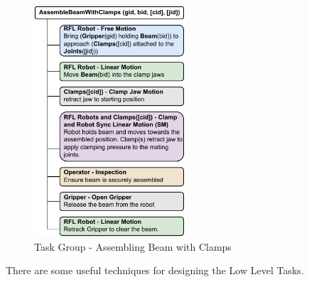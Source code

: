\begin{figure}[!p]
    \centering
    \includegraphics[width=0.50\textwidth]{images/6a/lowleveltask-5.pdf}
    \caption{Task Group - Assembling Beam with Clamps}
    \label{fig:task-group-5}
\end{figure}

There are some useful techniques for designing the Low Level Tasks. 

